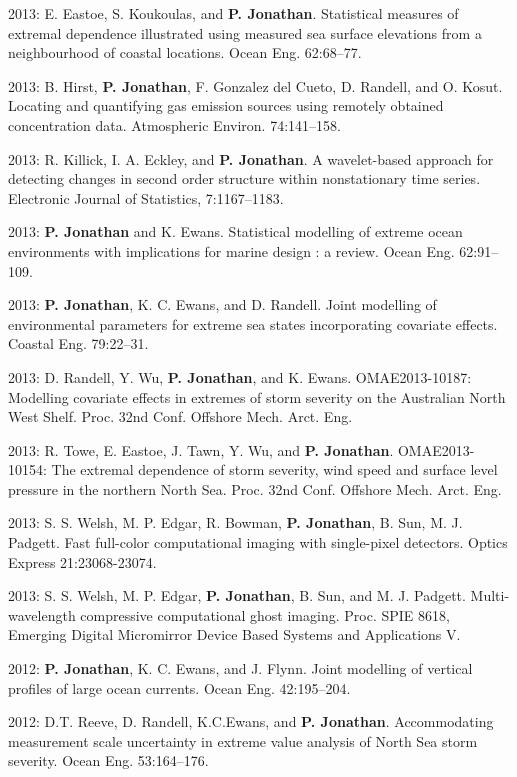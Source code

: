 \documentclass[11pt,a4paper]{moderncv}
\begin{document}
2013: E. Eastoe, S. Koukoulas, and \textbf{P. Jonathan}. Statistical measures of extremal dependence illustrated using measured sea surface elevations from a neighbourhood of coastal locations. Ocean Eng. 62:68--77.

2013: B. Hirst, \textbf{P. Jonathan}, F. Gonzalez del Cueto, D. Randell, and O. Kosut. Locating and quantifying gas emission sources using remotely obtained concentration data. Atmospheric Environ. 74:141--158.

2013: R. Killick, I. A. Eckley, and \textbf{P. Jonathan}. A wavelet-based approach for detecting changes in second order structure within nonstationary time series. Electronic Journal of Statistics, 7:1167--1183.

2013: \textbf{P. Jonathan} and K. Ewans. Statistical modelling of extreme ocean environments with implications for marine design : a review. Ocean Eng. 62:91--109.

2013: \textbf{P. Jonathan}, K. C. Ewans, and D. Randell. Joint modelling of environmental parameters for extreme sea states incorporating covariate effects. Coastal Eng. 79:22--31.

2013: D. Randell, Y. Wu, \textbf{P. Jonathan}, and K. Ewans. OMAE2013-10187: Modelling covariate effects in extremes of storm severity on the Australian North West Shelf. Proc. 32nd Conf. Offshore Mech. Arct. Eng.

2013: R. Towe, E. Eastoe, J. Tawn, Y. Wu, and \textbf{P. Jonathan}. OMAE2013-10154: The extremal dependence of storm severity, wind speed and surface level pressure in the northern North Sea. Proc. 32nd Conf. Offshore Mech. Arct. Eng.

2013: S. S. Welsh, M. P. Edgar, R. Bowman, \textbf{P. Jonathan}, B. Sun, M. J. Padgett. Fast full-color computational imaging with single-pixel detectors. Optics Express 21:23068-23074.

2013: S. S. Welsh, M. P. Edgar, \textbf{P. Jonathan}, B. Sun, and M. J. Padgett. Multi-wavelength compressive computational ghost imaging. Proc. SPIE 8618, Emerging Digital Micromirror Device Based Systems and Applications V.

2012: \textbf{P. Jonathan}, K. C. Ewans, and J. Flynn. Joint modelling of vertical profiles of large ocean currents. Ocean Eng. 42:195--204.

2012: D.T. Reeve, D. Randell, K.C.Ewans, and \textbf{P. Jonathan}. Accommodating measurement scale uncertainty in extreme value analysis of North Sea storm severity. Ocean Eng. 53:164--176.
\end{document}
